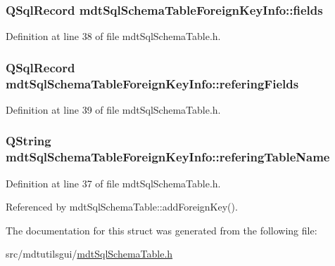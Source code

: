 \hypertarget{structmdt_sql_schema_table_foreign_key_info_a889196c9a4cb8c89722de9f03fa6daae}{
\subsubsection[{fields}]{\setlength{\rightskip}{0pt plus 5cm}Q\-Sql\-Record mdt\-Sql\-Schema\-Table\-Foreign\-Key\-Info\-::fields}}\label{structmdt_sql_schema_table_foreign_key_info_a889196c9a4cb8c89722de9f03fa6daae}


Definition at line 38 of file mdt\-Sql\-Schema\-Table.\-h.

\hypertarget{structmdt_sql_schema_table_foreign_key_info_a23be89174f7131ce33047b11da180504}{
\subsubsection[{refering\-Fields}]{\setlength{\rightskip}{0pt plus 5cm}Q\-Sql\-Record mdt\-Sql\-Schema\-Table\-Foreign\-Key\-Info\-::refering\-Fields}}\label{structmdt_sql_schema_table_foreign_key_info_a23be89174f7131ce33047b11da180504}


Definition at line 39 of file mdt\-Sql\-Schema\-Table.\-h.

\hypertarget{structmdt_sql_schema_table_foreign_key_info_a67a54a858ca960ed0da71f734bb222b1}{
\subsubsection[{refering\-Table\-Name}]{\setlength{\rightskip}{0pt plus 5cm}Q\-String mdt\-Sql\-Schema\-Table\-Foreign\-Key\-Info\-::refering\-Table\-Name}}\label{structmdt_sql_schema_table_foreign_key_info_a67a54a858ca960ed0da71f734bb222b1}


Definition at line 37 of file mdt\-Sql\-Schema\-Table.\-h.



Referenced by mdt\-Sql\-Schema\-Table\-::add\-Foreign\-Key().



The documentation for this struct was generated from the following file\-:\begin{DoxyCompactItemize}
\item 
src/mdtutilsgui/\hyperlink{mdt_sql_schema_table_8h}{mdt\-Sql\-Schema\-Table.\-h}\end{DoxyCompactItemize}
